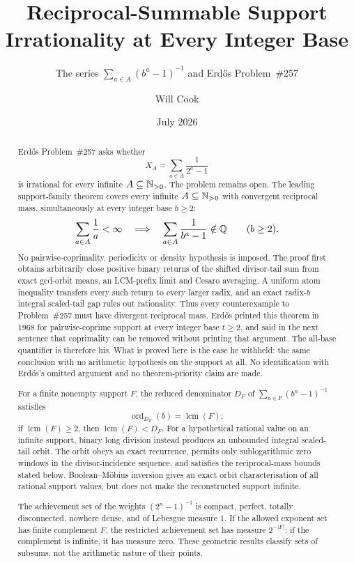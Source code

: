 \documentclass[11pt]{article}
\title{Reciprocal-Summable Support Irrationality at Every Integer Base}
\subtitle{The series $\sum_{a\in A}(b^a-1)^{-1}$ and Erd\H{o}s Problem~\#257}
\author{Will Cook}
\date{July 2026}
\begin{document}
\maketitle
\noteprovenance

\begin{abstract}
\noindent
Erd\H{o}s Problem~\#257 asks whether
\[
 X_A=\sum_{a\in A}\frac1{2^a-1}
\]
is irrational for every infinite \(A\subseteq\mathbb{N}_{>0}\).  The problem remains
open.  The leading support-family theorem covers every infinite
\(A\subseteq\mathbb{N}_{>0}\) with convergent reciprocal mass, simultaneously at every
integer base \(b\ge2\):
\[
 \sum_{a\in A}\frac1a<\infty
 \quad\Longrightarrow\quad
 \sum_{a\in A}\frac1{b^a-1}\notin\mathbb{Q}
 \qquad(b\ge2).
\]
No pairwise-coprimality, periodicity or density hypothesis is imposed.  The
proof first obtains arbitrarily close positive binary returns of the shifted
divisor-tail sum from exact gcd-orbit means, an LCM-prefix limit and Cesaro
averaging.  A uniform atom inequality transfers every such return to every
larger radix, and an exact radix-\(b\) integral scaled-tail gap rules out
rationality.  Thus every counterexample to Problem~\#257 must have divergent
reciprocal mass.  Erd\H{o}s printed this theorem in 1968 for pairwise-coprime
support at every integer base \(t\ge2\), and said in the next sentence that
coprimality can be removed without printing that argument.  The all-base
quantifier is therefore his.  What is proved here is the case he withheld: the
same conclusion with no arithmetic hypothesis on the support at all.  No
identification with Erd\H{o}s's omitted argument and no theorem-priority claim
are made.

For a finite nonempty support \(F\), the reduced denominator \(D_F\) of
\(\sum_{n\in F}(b^n-1)^{-1}\) satisfies
\[
 \operatorname{ord}_{D_F}(b)=\operatorname{lcm}(F);
\]
if \(\operatorname{lcm}(F)\ge2\), then
\(\operatorname{lcm}(F)<D_F\).  For a hypothetical rational value on an
infinite support, binary long division instead produces an unbounded integral
scaled-tail orbit.  The orbit obeys an exact recurrence, permits only
sublogarithmic zero windows in the divisor-incidence sequence, and satisfies
the reciprocal-mass bounds stated below.  Boolean--M\"obius inversion gives an
exact orbit characterisation of all rational support values, but does not make
the reconstructed support infinite.

The achievement set of the weights \((2^n-1)^{-1}\) is compact, perfect,
totally disconnected, nowhere dense, and of Lebesgue measure \(1\).  If the
allowed exponent set has finite complement \(F\), the restricted achievement
set has measure \(2^{-|F|}\); if the complement is infinite, it has measure
zero.  These geometric results classify sets of subsums, not the arithmetic
nature of their points.


\end{abstract}
\end{document}
